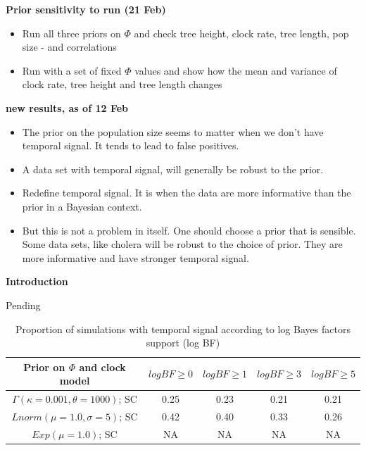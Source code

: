 \documentclass[11pt]{article}
\begin{document}
\textbf{Prior sensitivity to run (21 Feb)}
\begin{itemize}
	\item Run all three priors on $\Phi$ and check
	\subitem tree height, clock rate, tree length, pop size - and correlations
	\item Run with a set of fixed $\Phi$ values and show how the mean and variance of clock rate, tree height and tree length changes 
\end{itemize}

\textbf{new results, as of 12 Feb}
\begin{itemize}
	\item The prior on the population size seems to matter when we don't have temporal signal. It tends to lead to false positives. 
	\item A data set with temporal signal, will generally be robust to the prior. 
	\item Redefine temporal signal. It is when the data are more informative than the prior in a Bayesian context.
	\item But this is not a problem in itself. One should choose a prior that is sensible. Some data sets, like cholera will be robust to the choice of prior. They are more informative and have stronger temporal signal. 
\end{itemize}





\begin{Large}
	\textbf{Introduction}
\end{Large}

Pending


\begin{table}[H]
\caption{Proportion of simulations with temporal signal according to log Bayes factors support (log BF)}
\begin{center} 
	\label{table:logBF_pp_correspondence}
	\begin{tabular}{c|c|c|c|c}
		Prior on $\Phi$ and clock model & $log BF\ge0$ & $log BF\ge1$ & $log BF\ge3$ & $log BF\ge5$\\
		\hline
		$\Gamma(\kappa=0.001, \theta=1000)$; SC & 0.25 & 0.23 & 0.21 & 0.21 \\
		$Lnorm(\mu=1.0, \sigma=5)$; SC & 0.42 & 0.40 & 0.33 & 0.26 \\
		$Exp(\mu=1.0)$; SC & NA & NA & NA & NA \\
	\end{tabular}
\end{center}	\vspace{-0.4cm}
\end{table}
\end{document}

